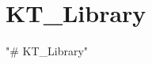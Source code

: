 \chapter{KT\+\_\+\+Library}
\hypertarget{index}{}\label{index}
\label{index_md__c_1_2_src_2projet__library_2_r_e_a_d_m_e}%
%
 "{}\# KT\+\_\+\+Library"{} 